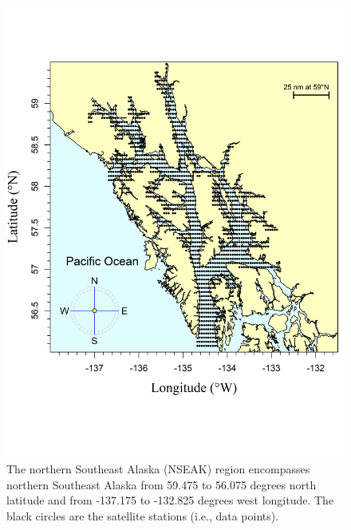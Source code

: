 \documentclass[
]{article}
\begin{document}
\begin{figure}
\centering
\includegraphics{../../2024_forecast/results/temperature_data/NSEAK.png}
\caption{The northern Southeast Alaska (NSEAK) region encompasses
northern Southeast Alaska from 59.475 to 56.075 degrees north latitude
and from -137.175 to -132.825 degrees west longitude. The black circles
are the satellite stations (i.e., data points).}
\end{figure}
\end{document}
